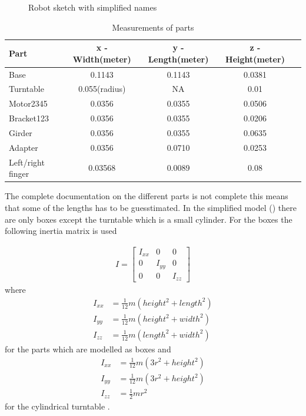 \begin{figure}[htbp]
  \centering
  
  \caption{Robot sketch with simplified names}
  \label{fig:naming}
\end{figure}

\begin{table}[htbp]
\centering
\caption{Measurements of parts}
\label{table:measurements}
    \begin{tabular}{l c c c r}
        \toprule
        Part  &  x - Width(meter) & y - Length(meter) & z - Height(meter)\\
        \midrule
        Base & 0.1143 & 0.1143 & 0.0381\\
        Turntable & 0.055(radius) & NA & 0.01\\
        Motor2345 & 0.0356 & 0.0355 & 0.0506 \\
        Bracket123 & 0.0356 & 0.0355 & 0.0206 \\
        Girder & 0.0356 & 0.0355 & 0.0635\\
        Adapter & 0.0356 & 0.0710 & 0.0253\\
        Left/right finger & 0.03568 & 0.0089 & 0.08\\
        \bottomrule
    \end{tabular}
\end{table}


The complete documentation on the different parts is not complete this means that some of the lengths has to be guesstimated\cite{Crustcrawler}. In the simplified model () there are only boxes except the turntable which is a small cylinder. For the boxes the following inertia matrix is used

\begin{align*}
    I = 
    \begin{bmatrix}
        I_{xx} & 0 & 0\\
        0 & I_{yy} & 0\\
        0 & 0 & I_{zz}
    \end{bmatrix}
\end{align*}
where
\begin{align*}
    I_{xx} &= \frac{1}{12}m(height^2+length^2)\\
    I_{yy} &= \frac{1}{12}m(height^2+width^2)\\
    I_{zz} &= \frac{1}{12}m(length^2+width^2)
\end{align*}
for the parts which are modelled as boxes and 
\begin{align*}
    I_{xx} &= \frac{1}{12}m(3r^2+height^2)\\
    I_{yy} &= \frac{1}{12}m(3r^2+height^2)\\
    I_{zz} &= \frac{1}{2}mr^2
\end{align*}
for the cylindrical turntable \cite{Dupac}. 

